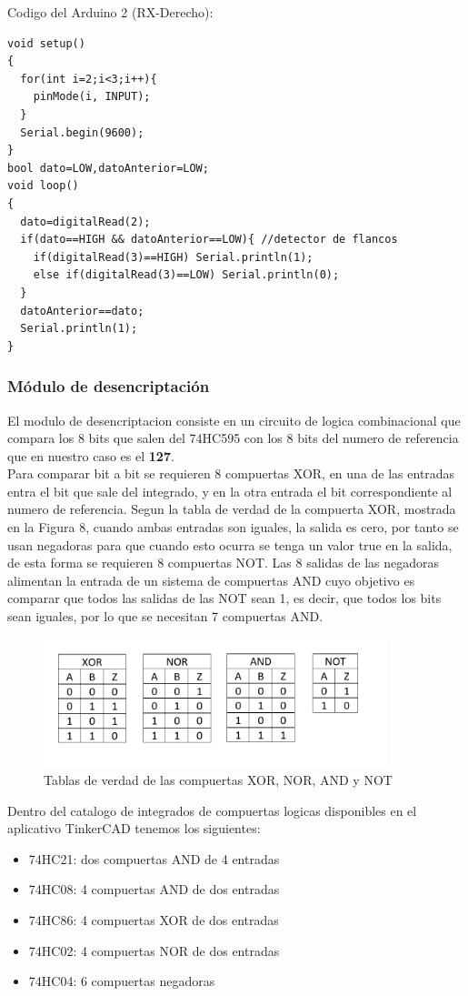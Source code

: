 \documentclass{article}
\begin{document}
\noindent
Codigo del Arduino 2 (RX-Derecho):

\begin{lstlisting}[style=C++]
void setup()
{
  for(int i=2;i<3;i++){
  	pinMode(i, INPUT);
  } 
  Serial.begin(9600);
}
bool dato=LOW,datoAnterior=LOW;
void loop()
{
  dato=digitalRead(2);
  if(dato==HIGH && datoAnterior==LOW){ //detector de flancos
  	if(digitalRead(3)==HIGH) Serial.println(1);
    else if(digitalRead(3)==LOW) Serial.println(0);
  }
  datoAnterior==dato;
  Serial.println(1);
}
\end{lstlisting}

\subsubsection{Módulo de desencriptación}
El modulo de desencriptacion consiste en un circuito de logica combinacional que compara los 8 bits que salen del 74HC595 con los 8 bits del numero de referencia que en nuestro caso es el \textbf{127}.\\

Para comparar bit a bit se requieren 8 compuertas XOR, en una de las entradas entra el bit que sale del integrado, y en la otra entrada el bit correspondiente al numero de referencia. Segun la tabla de verdad de la compuerta XOR, mostrada en la Figura 8, cuando ambas entradas son iguales, la salida es cero, por tanto se usan negadoras para que cuando esto ocurra se tenga un valor true en la salida, de esta forma se requieren 8 compuertas NOT. Las 8 salidas de las negadoras alimentan la entrada de un sistema de compuertas AND cuyo objetivo es comparar que todos las salidas de las NOT sean 1, es decir, que todos los bits sean iguales, por lo que se necesitan 7 compuertas AND.\\


\begin{figure}[!ht] 
\includegraphics[width=10cm]{compuertas.png}
\centering
\caption{Tablas de verdad de las compuertas XOR, NOR, AND y NOT}
\end{figure}

Dentro del catalogo de integrados de compuertas logicas disponibles en el aplicativo TinkerCAD tenemos los siguientes:
\begin{itemize}
    \item 74HC21: dos compuertas AND de 4 entradas
    \item 74HC08: 4 compuertas AND de dos entradas
    \item 74HC86: 4 compuertas XOR de dos entradas
    \item 74HC02: 4 compuertas NOR de dos entradas
    \item 74HC04: 6 compuertas negadoras\\
\end{itemize}
\end{document}
